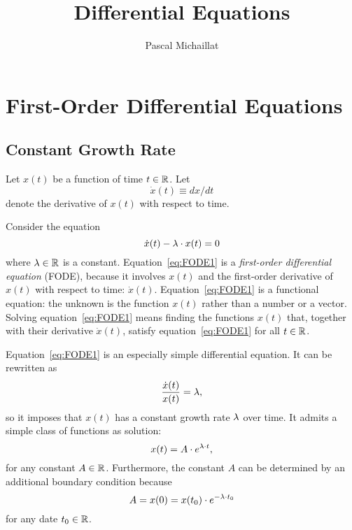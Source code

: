 \documentclass[letterpaper,12pt,leqno]{article}
\begin{document}
\title{Differential Equations}
\author{Pascal Michaillat}
\date{}

\begin{titlepage}
\maketitle
\tableofcontents
\end{titlepage}

\section{First-Order Differential Equations}\label{sec:one}

\subsection{Constant Growth Rate}

Let $x(t)$ be a function of time $t\in\mathbb{R}$. Let \[\dot{x}(t)\equiv dx/dt\] denote the derivative of $x(t)$ with respect to time. 

Consider the equation 
\begin{equation}
\dot{x}(t) -\lambda\cdot x(t) = 0
\label{eq:FODE1}\end{equation}
where $\lambda\in\mathbb{R}$ is a constant. Equation~\eqref{eq:FODE1} is a \textit{first-order differential equation} (FODE), because it involves $x(t)$ and the first-order derivative of $x(t)$ with respect to time: $\dot{x}(t)$.  Equation~\eqref{eq:FODE1} is a functional equation: the unknown is the function $x(t)$ rather than a number or a vector. Solving equation~\eqref{eq:FODE1} means finding the functions $x(t)$ that, together with their derivative $\dot{x}(t)$, satisfy equation~\eqref{eq:FODE1} for all $t \in \mathbb{R}$.

Equation~\eqref{eq:FODE1} is an especially simple differential equation. It can be rewritten as 
\[\frac{\dot{x}(t)}{x(t)}= \lambda,\]
so it imposes that $x(t)$ has a constant growth rate $\lambda$ over time. It admits a simple class of functions as solution:
\begin{equation}
x(t) =A\cdot  e^{\lambda \cdot t} \label{eq:FODE1sol},
\end{equation}
for any constant $A\in \mathbb{R}$. Furthermore, the constant $A$ can be determined by an additional boundary condition because
\[A=x(0)=x(t_{0})\cdot e^{-\lambda \cdot t_{0}}\]
for any date $t_{0}\in \mathbb{R}$.
\end{document}
